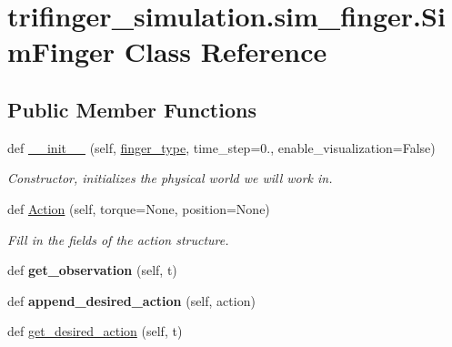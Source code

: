 \hypertarget{classtrifinger__simulation_1_1sim__finger_1_1SimFinger}{}\section{trifinger\+\_\+simulation.\+sim\+\_\+finger.\+Sim\+Finger Class Reference}
\label{classtrifinger__simulation_1_1sim__finger_1_1SimFinger}
\subsection*{Public Member Functions}
\begin{DoxyCompactItemize}
\item 
def \hyperlink{classtrifinger__simulation_1_1sim__finger_1_1SimFinger_a3bf64d6f490e704bfe3626bd0125451a}{\+\_\+\+\_\+init\+\_\+\+\_\+} (self, \hyperlink{classtrifinger__simulation_1_1sim__finger_1_1SimFinger_a34b39b76cad22883bee483aed5d79b09}{finger\+\_\+type}, time\+\_\+step=0., enable\+\_\+visualization=False)
\begin{DoxyCompactList}\small\item\em Constructor, initializes the physical world we will work in. \end{DoxyCompactList}\item 
def \hyperlink{classtrifinger__simulation_1_1sim__finger_1_1SimFinger_ad5b6ac0efef02c0f3334a44e79bd4413}{Action} (self, torque=None, position=None)
\begin{DoxyCompactList}\small\item\em Fill in the fields of the action structure. \end{DoxyCompactList}\item 
\mbox{\label{classtrifinger__simulation_1_1sim__finger_1_1SimFinger_ad02a3dc3f4a3c824fec864ce1d1464e9}} 
def {\bfseries get\+\_\+observation} (self, t)
\item 
\mbox{\label{classtrifinger__simulation_1_1sim__finger_1_1SimFinger_a71650072f6feecbc2c78a16cfa12ee77}} 
def {\bfseries append\+\_\+desired\+\_\+action} (self, action)
\item 
def \hyperlink{classtrifinger__simulation_1_1sim__finger_1_1SimFinger_a1a808eb19a1a9a13a4c0fe4f2d07d26c}{get\+\_\+desired\+\_\+action} (self, t)

\end{DoxyCompactItemize}
